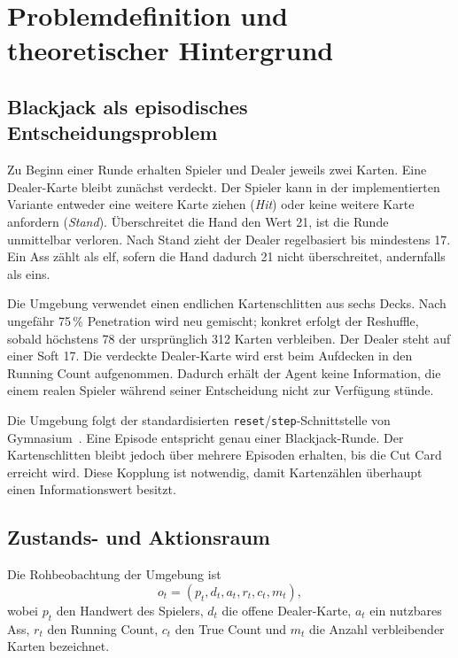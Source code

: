 \section{Problemdefinition und theoretischer Hintergrund}
\label{sec:hintergrund}

\subsection{Blackjack als episodisches Entscheidungsproblem}

Zu Beginn einer Runde erhalten Spieler und Dealer jeweils zwei
Karten. Eine Dealer-Karte bleibt zunächst verdeckt. Der Spieler kann
in der implementierten Variante entweder eine weitere Karte ziehen
(\emph{Hit}) oder keine weitere Karte anfordern (\emph{Stand}).
Überschreitet die Hand den Wert 21, ist die Runde unmittelbar
verloren. Nach Stand zieht der Dealer regelbasiert bis mindestens 17.
Ein Ass zählt als elf, sofern die Hand dadurch 21 nicht
überschreitet, andernfalls als eins.

Die Umgebung verwendet einen endlichen Kartenschlitten aus sechs
Decks. Nach ungefähr 75\,\% Penetration wird neu gemischt; konkret
erfolgt der Reshuffle, sobald höchstens 78 der ursprünglich 312
Karten verbleiben. Der Dealer steht auf einer Soft 17. Die verdeckte
Dealer-Karte wird erst beim Aufdecken in den Running Count
aufgenommen. Dadurch erhält der Agent keine Information, die einem
realen Spieler während seiner Entscheidung nicht zur Verfügung stünde.

Die Umgebung folgt der standardisierten
\texttt{reset}/\texttt{step}-Schnittstelle von
Gymnasium~\cite{towers2024gymnasium}. Eine Episode entspricht genau
einer Blackjack-Runde. Der Kartenschlitten bleibt jedoch über mehrere
Episoden erhalten, bis die Cut Card erreicht wird. Diese Kopplung ist
notwendig, damit Kartenzählen überhaupt einen Informationswert besitzt.

\subsection{Zustands- und Aktionsraum}

Die Rohbeobachtung der Umgebung ist
\begin{equation}
  o_t=(p_t,d_t,a_t,r_t,c_t,m_t),
\end{equation}
wobei $p_t$ den Handwert des Spielers, $d_t$ die offene Dealer-Karte,
$a_t$ ein nutzbares Ass, $r_t$ den Running Count, $c_t$ den True
Count und $m_t$ die Anzahl verbleibender Karten bezeichnet.

